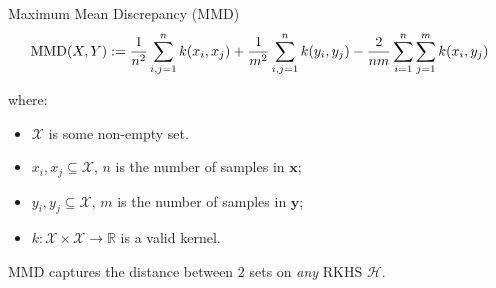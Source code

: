 \documentclass[aspectratio=169, 10pt, dvipsnames]{beamer}
\def\xlist{4}
\def\ylist{4}
\newcommand{\fillrandomly}[7]{
  \pgfmathsetmacro\diameter{#3*2}
  \foreach \i in {1,...,#4}{
    \pgfmathsetmacro\x{rnd*#1}
    \pgfmathsetmacro\y{rnd*#2}
    \xdef\collision{0}
    \foreach \element [count=\i] in \xlist{
      \pgfmathtruncatemacro\j{\i-1}
      \pgfmathsetmacro\checkdistance{ sqrt( ({\xlist}[\j]-(\x))^2 + ({\ylist}[\j]-(\y))^2 ) }
      \ifdim\checkdistance pt<\diameter pt
        \xdef\collision{1}
        \breakforeach
      \fi
    }
    \ifnum\collision=0
      \xdef\xlist{\xlist,\x}
      \xdef\ylist{\ylist,\y}
      \draw [#5, fill=#5] (\x + #6,\y+ #7) circle [radius=#3];
    \fi

  }
}
\newcommand\arrowfromto[5][blue]{%
  \draw[#1] #2 -- ( $ #2!#4!#3 $ ) node [midway, sloped, above] {#5}}
\begin{document}
\begin{frame}[fragile]{Maximum Mean Discrepancy (MMD)}
  \begin{equation*}
    \text{MMD}(X, Y) := {1\over n^2} \sum_{i,j=1}^{n}k(x_i, x_j) + {1\over m^2} \sum_{i,j=1}^{n}k(y_i, y_j) - {2\over nm} \sum_{i=1}^{n}\sum_{j=1}^{m}k(x_i, y_j)
  \end{equation*}
  \begin{minipage}{0.28\textwidth}
    \begin{figure}
      \begin{flushleft}
    \end{flushleft}
  \end{figure}
  \end{minipage}
  \hfill
  \begin{minipage}{0.65\textwidth}
    where:
    \begin{itemize}
    \item $\mathcal{X}$ is some non-empty set.
    \item  $x_i, x_j \subseteq \mathcal{X}$, $n$ is the number of samples in $\mathbf{x}$;
    \item  $y_i, y_j \subseteq \mathcal{X}$, $m$ is the number of samples in $\mathbf{y}$;
    \item $k: \mathcal{X}\times\mathcal{X}\to\mathbb{R}$ is a valid kernel.
    \end{itemize}

    \small MMD captures the distance between 2 sets on \emph{any} RKHS $\mathcal{H}$.

  \end{minipage}
\end{frame}
\end{document}

